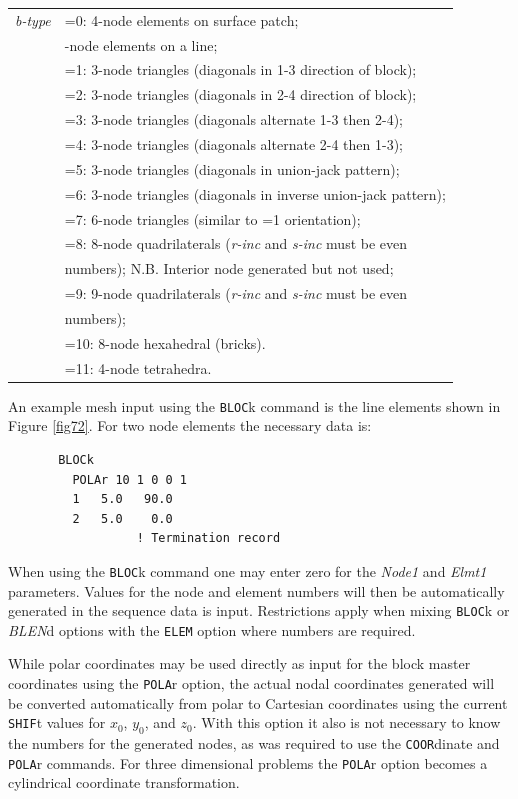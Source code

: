 \begin{center}
\begin{tabular}{l l}
\it b-type &=0: 4-node elements on surface patch; \\
           &\qquad 2-node elements on a line; \\
           &=1: 3-node triangles (diagonals in 1-3 direction of block); \\
           &=2: 3-node triangles (diagonals in 2-4 direction of block); \\
           &=3: 3-node triangles (diagonals alternate 1-3 then 2-4); \\
           &=4: 3-node triangles (diagonals alternate 2-4 then 1-3); \\
           &=5: 3-node triangles (diagonals in union-jack pattern); \\
           &=6: 3-node triangles (diagonals in inverse union-jack pattern); \\
           &=7: 6-node triangles (similar to =1 orientation); \\
           &=8: 8-node quadrilaterals ({\it r-inc} and {\it s-inc} must be even \\
           &\qquad numbers);  N.B. Interior node generated but not used; \\
           &=9: 9-node quadrilaterals ({\it r-inc} and {\it s-inc} must be even \\
           &\qquad numbers); \\
           &=10: 8-node hexahedral (bricks).\\
           &=11: 4-node tetrahedra.\\
\end{tabular}
\end{center}

An example mesh input using the {\tt BLOC}k command is the line
elements shown in Figure \ref{fig72}.
For two node elements the necessary data is:
\begin{verbatim}
       BLOCk
         POLAr 10 1 0 0 1
         1   5.0   90.0
         2   5.0    0.0
                  ! Termination record
\end{verbatim}
When using the {\tt BLOC}k command one may enter zero for the
{\it Node1} and {\it Elmt1} parameters.
Values for the node and element numbers will then be automatically generated
in the sequence data is input.  Restrictions apply when mixing {\tt BLOC}k
or {\it BLEN}d options with the {\tt ELEM} option where numbers are required.

While polar coordinates
may be used directly as input for the block master coordinates using the
{\tt POLA}r option,
the actual nodal coordinates generated will be converted automatically
from polar to Cartesian coordinates using the current {\tt SHIF}t values
for $x_0$, $y_0$, and $z_0$.
With this option it also is not necessary to know the numbers for the
generated nodes, as was required to use the {\tt COOR}\-dinate and
{\tt POLA}r commands.
For three dimensional problems the {\tt POLA}r option becomes a cylindrical
coordinate transformation.

